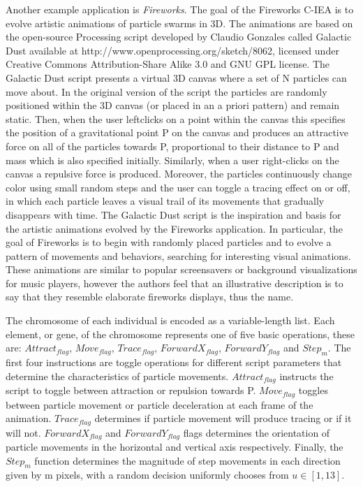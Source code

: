 \documentclass{sig-alternate}
\begin{document}
Another example application is \emph{Fireworks}. The goal of the Fireworks C-IEA is to evolve artistic animations of particle swarms in 3D. The animations are based on the open-source Processing script developed by Claudio Gonzales called Galactic Dust available at http://www.openprocessing.org/sketch/8062,
licensed under Creative Commons Attribution-Share Alike 3.0 and GNU GPL license. The Galactic Dust script presents a virtual 3D canvas where a set of N particles can move
about. In the original version of the script the particles are
randomly positioned within the 3D canvas (or placed in an
a priori pattern) and remain static. Then, when the user leftclicks
on a point within the canvas this specifies the position
of a gravitational point P on the canvas and produces an
attractive force on all of the particles towards P, proportional
to their distance to P and mass which is also specified initially.
Similarly, when a user right-clicks on the canvas a repulsive
force is produced. Moreover, the particles continuously change
color using small random steps and the user can toggle a
tracing effect on or off, in which each particle leaves a visual
trail of its movements that gradually disappears with time.
The Galactic Dust script is the inspiration and basis for
the artistic animations evolved by the Fireworks application.
In particular, the goal of Fireworks is to begin with randomly
placed particles and to evolve a pattern of movements and
behaviors, searching for interesting visual animations. These
animations are similar to popular screensavers or background
visualizations for music players, however the authors feel that
an illustrative description is to say that they resemble elaborate
fireworks displays, thus the name. 

The chromosome of each individual
is encoded as a variable-length list. Each element,
or gene, of the chromosome represents one of five basic
operations, these are: $Attract_{flag}$, $Move_{flag}$, $Trace_{flag}$,
$ForwardX_{flag}$, $ForwardY_{flag}$ and $Step_{m}$. The first four
instructions are toggle operations for different script parameters
that determine the characteristics of particle movements.
$Attract_{flag}$ instructs the script to toggle between attraction
or repulsion towards P. $Move_{flag}$ toggles between particle
movement or particle deceleration at each frame of the animation.
$Trace_{flag}$ determines if particle movement will produce
tracing or if it will not. $ForwardX_{flag}$ and $ForwardY_{flag}$
flags determines the orientation of particle movements in the
horizontal and vertical axis respectively. Finally, the $Step_{m}$
function determines the magnitude of step movements in each
direction given by m pixels, with a random decision uniformly
chooses from $u \in [1, 13]$.
\end{document}
